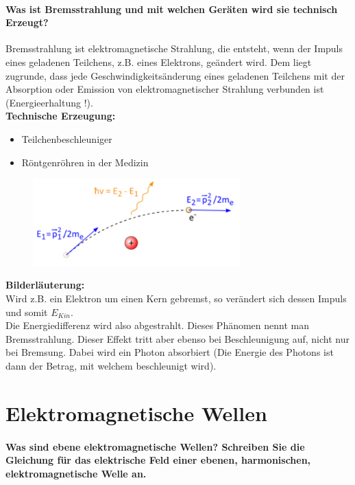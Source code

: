 \documentclass[a4paper, 11pt, parskip=half]{scrartcl}
\begin{document}
\paragraph{Was ist Bremsstrahlung und mit welchen Geräten wird sie technisch Erzeugt?}
Bremsstrahlung ist elektromagnetische Strahlung, die entsteht, wenn der Impuls eines geladenen Teilchens, z.B. eines Elektrons, geändert wird. Dem liegt zugrunde, dass jede Geschwindigkeitsänderung eines geladenen Teilchens mit der Absorption oder Emission von elektromagnetischer Strahlung verbunden ist (Energieerhaltung !).\\
\textbf{Technische Erzeugung:} \\
\begin{itemize}
\item Teilchenbeschleuniger
\item Röntgenröhren in der Medizin
\end{itemize}
\begin{figure}[H]
    \centering
    \includegraphics[width=8cm]{image/12/6.png}
\end{figure}
\textbf{Bilderläuterung:} \\
Wird z.B. ein Elektron um einen Kern gebremst, so verändert sich dessen Impuls und somit $E_{Kin}$. \\
Die Energiedifferenz wird also abgestrahlt. Dieses Phänomen nennt man Bremsstrahlung. Dieser Effekt tritt aber ebenso bei Beschleunigung auf, nicht nur bei Bremsung. Dabei wird ein Photon absorbiert (Die Energie des Photons ist dann der Betrag, mit welchem beschleunigt wird).

\newpage

\section{Elektromagnetische Wellen}

\paragraph{Was sind ebene elektromagnetische Wellen? Schreiben Sie die Gleichung für das elektrische
Feld einer ebenen, harmonischen, elektromagnetische Welle an.}
\end{document}
